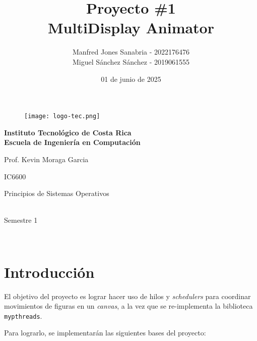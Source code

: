 \documentclass[12pt]{article}
\date{}
\title{\textbf{{\huge Proyecto \#1}\\[15pt]MultiDisplay Animator}}
\author{Manfred Jones Sanabria - 2022176476\\[10pt]Miguel Sánchez Sánchez - 2019061555}
\begin{document}

\begin{figure}[t!]
   \centering
   \texttt{[image: logo-tec.png]} 
   \label{fig:1}
\end{figure}

\begingroup
\centering
\textbf{Instituto Tecnológico de Costa Rica\\Escuela de Ingeniería en Computación\\}
\endgroup

\hfill\authors

{\let\newpage\relax\maketitle}


\begingroup
\centering
\large
Prof. Kevin Moraga Garcia
\\[20pt]\par
\endgroup

\begingroup
\centering
\large
IC6600
\\[20pt]\par
\endgroup

\begingroup
\centering
\large
Principios de Sistemas Operativos\\ 
\\[20pt]\par
\endgroup

\begingroup
\centering
\large
Semestre 1
\\[20pt]\par
\endgroup

\begingroup
\centering
\large
\date{01 de junio de 2025} 
\\[20pt]\par
\endgroup

\vspace*{\fill}
\newpage


\section{Introducción}


El objetivo del proyecto es lograr hacer uso de hilos y \textit{schedulers} para coordinar movimientos de figuras en un \textit{canvas}, a la vez que se re-implementa la biblioteca \texttt{mypthreads}.

Para lograrlo, se implementarán las siguientes bases del proyecto:
\end{document}
